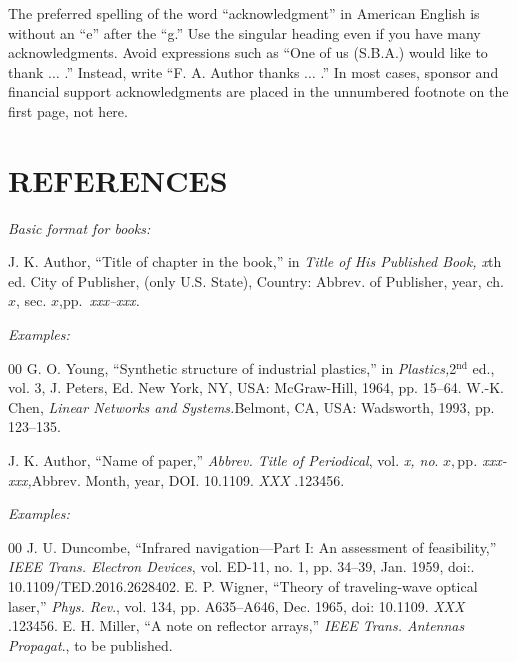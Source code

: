 \documentclass[journal,onecolumn,web]{ieeecolor}
\begin{document}
The preferred spelling of the word ``acknowledgment'' in American English is 
without an ``e'' after the ``g.'' Use the singular heading even if you have 
many acknowledgments. Avoid expressions such as ``One of us (S.B.A.) would 
like to thank $\ldots$ .'' Instead, write ``F. A. Author thanks $\ldots$ .'' In most 
cases, sponsor and financial support acknowledgments are placed in the 
unnumbered footnote on the first page, not here.

\section*{REFERENCES}

\def\refname{\vadjust{\vspace*{-2.5em}}} %

\noindent\textit{Basic format for books:}

\noindent J. K. Author, ``Title of chapter in the book,'' in {\it Title of His Published Book, x}th ed. City of Publisher,
(only U.S. State), Country: Abbrev. of Publisher, year, ch. $x$, sec. $x$,\break pp.~{\it xxx--xxx.}

{\it Examples:}{\vadjust{\vspace*{-2.5em}}}
\begin{thebibliography}{00}
 G. O. Young, ``Synthetic structure of industrial plastics,'' in {\it Plastics,}2$^{\mathrm{nd}}$ ed., vol. 3, J. Peters, Ed. New York, NY, USA: McGraw-Hill, 1964, pp. 15--64.
 W.-K. Chen, {\it Linear Networks and Systems.}Belmont, CA, USA: Wadsworth, 1993, pp. 123--135.
\end{thebibliography}


\noindent J. K. Author, ``Name of paper,'' {\it Abbrev. Title of Periodical}, vol. {\it x, no}. $x, $pp{\it . xxx-xxx,}Abbrev. Month, year, DOI.
 {10.1109.} {{\it XXX}} {.123456}.

{\it Examples:}{\vadjust{\vspace*{-2.5em}}}

\begin{thebibliography}{00}
 J. U. Duncombe, ``Infrared navigation---Part I: An assessment of feasibility,'' {\it IEEE Trans. Electron Devices}, vol. ED-11, no. 1, pp. 34--39, Jan. 1959, doi:.  {10.1109/TED.2016.2628402}.
 E. P. Wigner, ``Theory of traveling-wave optical laser,''
{\it Phys. Rev}., vol. 134, pp. A635--A646, Dec. 1965, doi:  {10.1109.} {{\it XXX}} {.123456}.
 E. H. Miller, ``A note on reflector arrays,'' {\it IEEE Trans. Antennas Propagat}., to be published.
\end{thebibliography}
\end{document}
